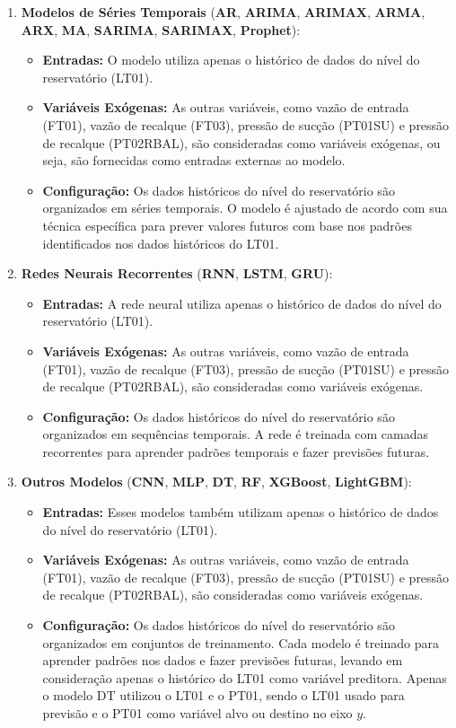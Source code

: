 \begin{enumerate}
	\item \textbf{Modelos de Séries Temporais} (\textbf{AR}, \textbf{ARIMA}, \textbf{ARIMAX}, \textbf{ARMA}, \textbf{ARX}, \textbf{MA}, \textbf{SARIMA}, \textbf{SARIMAX}, \textbf{Prophet}):
\begin{itemize}
	\item \textbf{Entradas:} O modelo utiliza apenas o histórico de dados do nível do reservatório (LT01).
	\item \textbf{Variáveis Exógenas:} As outras variáveis, como vazão de entrada (FT01), vazão de recalque (FT03), pressão de sucção (PT01SU) e pressão de recalque (PT02RBAL), são consideradas como variáveis exógenas, ou seja, são fornecidas como entradas externas ao modelo.
	\item \textbf{Configuração:} Os dados históricos do nível do reservatório são organizados em séries temporais. O modelo é ajustado de acordo com sua técnica específica para prever valores futuros com base nos padrões identificados nos dados históricos do LT01.

\end{itemize}
	\item  \textbf{Redes Neurais Recorrentes} (\textbf{RNN}, \textbf{LSTM}, \textbf{GRU}):
\begin{itemize}
	\item \textbf{Entradas:} A rede neural utiliza apenas o histórico de dados do nível do reservatório (LT01).
	\item \textbf{Variáveis Exógenas:} As outras variáveis, como vazão de entrada (FT01), vazão de recalque (FT03), pressão de sucção (PT01SU) e pressão de recalque (PT02RBAL), são consideradas como variáveis exógenas.
	\item \textbf{Configuração:} Os dados históricos do nível do reservatório são organizados em sequências temporais. A rede é treinada com camadas recorrentes para aprender padrões temporais e fazer previsões futuras.
\end{itemize}

\item  \textbf{Outros Modelos} (\textbf{CNN}, \textbf{MLP}, \textbf{DT}, \textbf{RF}, \textbf{XGBoost}, \textbf{LightGBM}):
\begin{itemize}
	\item \textbf{Entradas:} Esses modelos também utilizam apenas o histórico de dados do nível do reservatório (LT01).
	\item \textbf{Variáveis Exógenas:} As outras variáveis, como vazão de entrada (FT01), vazão de recalque (FT03), pressão de sucção (PT01SU) e pressão de recalque (PT02RBAL), são consideradas como variáveis exógenas.
	\item \textbf{Configuração:} Os dados históricos do nível do reservatório são organizados em conjuntos de treinamento. Cada modelo é treinado para aprender padrões nos dados e fazer previsões futuras, levando em consideração apenas o histórico do LT01 como variável preditora. Apenas o modelo DT utilizou o LT01 e o PT01, sendo o LT01 usado para previsão e o PT01 como variável alvo ou destino no eixo $y$.
\end{itemize}
\end{enumerate}
